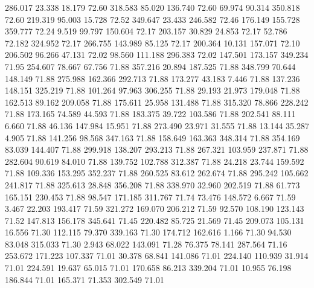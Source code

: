  286.017   23.338   18.179        72.60
 318.583   85.020  136.740        72.60
  69.974   90.314  350.818        72.60
 219.319   95.003   15.728        72.52
 349.647   23.433  246.582        72.46
 176.149  155.728  359.777        72.24
   9.519   99.797  150.604        72.17
 203.157   30.829   24.853        72.17
  52.786   72.182  324.952        72.17
 266.755  143.989   85.125        72.17
 200.364   10.131  157.071        72.10
 206.502   96.266   47.131        72.02
  98.560  111.188  296.383        72.02
 147.501  173.157  349.234        71.95
 254.607   78.667   67.756        71.88
 357.216   20.894  187.525        71.88
 348.799   70.644  148.149        71.88
 275.988  162.366  292.713        71.88
 173.277   43.183    7.446        71.88
 137.236  148.151  325.219        71.88
 101.264   97.963  306.255        71.88
  29.193   21.973  179.048        71.88
 162.513   89.162  209.058        71.88
 175.611   25.958  131.488        71.88
 315.320   78.866  228.242        71.88
 173.165   74.589   44.593        71.88
 183.375   39.722  103.586        71.88
 202.541   88.111    6.660        71.88
  46.136  147.984   15.951        71.88
 273.490   23.971   31.555        71.88
  13.144   35.287    4.905        71.88
 141.256   98.568  347.163        71.88
 158.649  163.363  348.314        71.88
 354.169   83.039  144.407        71.88
 299.918  138.207  293.213        71.88
 267.321  103.959  237.871        71.88
 282.604   90.619   84.010        71.88
 139.752  102.788  312.387        71.88
  24.218   23.744  159.592        71.88
 109.336  153.295  352.237        71.88
 260.525   83.612  262.674        71.88
 295.242  105.662  241.817        71.88
 325.613   28.848  356.208        71.88
 338.970   32.960  202.519        71.88
  61.773  165.151  230.453        71.88
  98.547  171.185  311.767        71.74
  73.476  148.572    6.667        71.59
   3.467   22.203  193.417        71.59
 321.272  169.070  206.212        71.59
  92.570  108.190  123.143        71.52
 147.813  156.178  345.641        71.45
 220.482   85.725   21.569        71.45
 209.073  105.131   16.556        71.30
 112.115   79.370  339.163        71.30
 174.712  162.616    1.166        71.30
  94.530   83.048  315.033        71.30
   2.943   68.022  143.091        71.28
  76.375   78.141  287.564        71.16
 253.672  171.223  107.337        71.01
  30.378   68.841  141.086        71.01
 224.140  110.939   31.914        71.01
 224.591   19.637   65.015        71.01
 170.658   86.213  339.204        71.01
  10.955   76.198  186.844        71.01
 165.371   71.353  302.549        71.01
